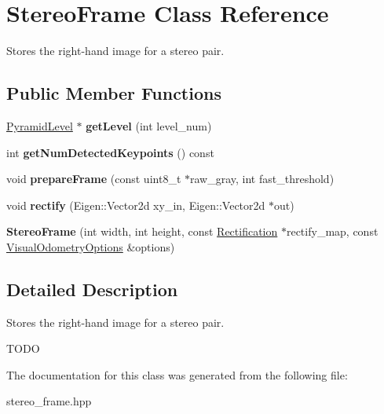 \hypertarget{classfovis_1_1StereoFrame}{
\section{StereoFrame Class Reference}
\label{classfovis_1_1StereoFrame}
}


Stores the right-\/hand image for a stereo pair.  


\subsection*{Public Member Functions}
\begin{DoxyCompactItemize}
\item 
\hypertarget{classfovis_1_1StereoFrame_a3a922a072358cf7d3b82235613f7e129}{
\hyperlink{classfovis_1_1PyramidLevel}{PyramidLevel} $\ast$ {\bfseries getLevel} (int level\_\-num)}
\label{classfovis_1_1StereoFrame_a3a922a072358cf7d3b82235613f7e129}

\item 
\hypertarget{classfovis_1_1StereoFrame_a6b34494d5f8a1666d216bae16f25640b}{
int {\bfseries getNumDetectedKeypoints} () const }
\label{classfovis_1_1StereoFrame_a6b34494d5f8a1666d216bae16f25640b}

\item 
\hypertarget{classfovis_1_1StereoFrame_a3e247d49631478f3ada787127e798de0}{
void {\bfseries prepareFrame} (const uint8\_\-t $\ast$raw\_\-gray, int fast\_\-threshold)}
\label{classfovis_1_1StereoFrame_a3e247d49631478f3ada787127e798de0}

\item 
\hypertarget{classfovis_1_1StereoFrame_a581c51ce9ea9ac8f8488fbf9803055c0}{
void {\bfseries rectify} (Eigen::Vector2d xy\_\-in, Eigen::Vector2d $\ast$out)}
\label{classfovis_1_1StereoFrame_a581c51ce9ea9ac8f8488fbf9803055c0}

\item 
\hypertarget{classfovis_1_1StereoFrame_aa9dff05ab404552e991bef9c4e1c9876}{
{\bfseries StereoFrame} (int width, int height, const \hyperlink{classfovis_1_1Rectification}{Rectification} $\ast$rectify\_\-map, const \hyperlink{group__FovisCore_ga113578b67d3e37bc78f1fffd8440e1ff}{VisualOdometryOptions} \&options)}
\label{classfovis_1_1StereoFrame_aa9dff05ab404552e991bef9c4e1c9876}

\end{DoxyCompactItemize}


\subsection{Detailed Description}
Stores the right-\/hand image for a stereo pair. 

TODO 

The documentation for this class was generated from the following file:\begin{DoxyCompactItemize}
\item 
stereo\_\-frame.hpp\end{DoxyCompactItemize}
